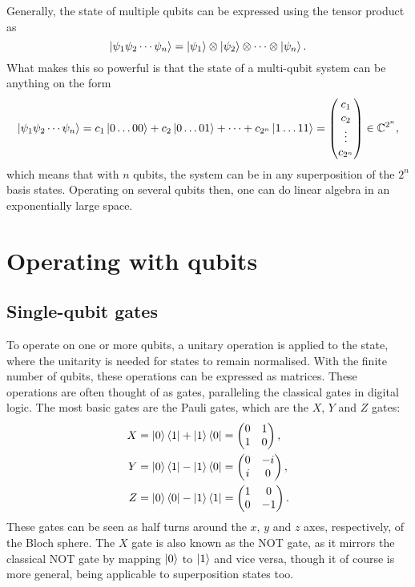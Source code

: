 Generally, the state of multiple qubits can be expressed using the tensor product as
\begin{equation}
  \ket{\psi_1 \psi_2 \cdots  \psi_n} = \ket{\psi_1} \otimes \ket{\psi_2} \otimes \cdots \otimes \ket{\psi_n}
  \label{eq:tensor}.
\end{equation}
What makes this so powerful is that the state of a multi-qubit system can be anything on the form
\begin{equation}
  \ket{\psi_1 \psi_2 \cdots  \psi_n}
  = c_1 \ket{0\dots 00} + c_2 \ket{0\dots 01} + \cdots + c_{2^n} \ket{1\dots 11}
  = \begin{pmatrix}
    c_1 \\ c_2 \\ \vdots \\ c_{2^n}
  \end{pmatrix}
  \in \mathbb{C}^{2^n},
  \label{eq:superposition}
\end{equation}
which means that with $n$ qubits, the system can be in any superposition of the $2^n$ basis states.
Operating on several qubits then, one can do linear algebra in an exponentially large space.

\section{Operating with qubits}
\subsection{Single-qubit gates}
To operate on one or more qubits, a unitary operation is applied to the state, where the unitarity is needed for states to remain normalised.
With the finite number of qubits, these operations can be expressed as matrices.
These operations are often thought of as gates, paralleling the classical gates in digital logic.
The most basic gates are the Pauli gates, which are the $X$, $Y$ and $Z$ gates:
\begin{align}
  X =\ket{0}\bra{1} + \ket{1}\bra{0} & = \begin{pmatrix} 0 & 1 \\ 1 & 0 \end{pmatrix},  \\
  Y =\ket{0}\bra{1} - \ket{1}\bra{0} & = \begin{pmatrix} 0 & -i \\ i & 0 \end{pmatrix}, \\
  Z =\ket{0}\bra{0} - \ket{1}\bra{1} & = \begin{pmatrix} 1 & 0 \\ 0 & -1 \end{pmatrix}.
\end{align}
These gates can be seen as half turns around the $x$, $y$ and $z$ axes, respectively, of the Bloch sphere.
The $X$ gate is also known as the NOT gate, as it mirrors the classical NOT gate by mapping $\ket{0}$ to $\ket{1}$ and vice versa, though it of course is more general, being applicable to superposition states too.

